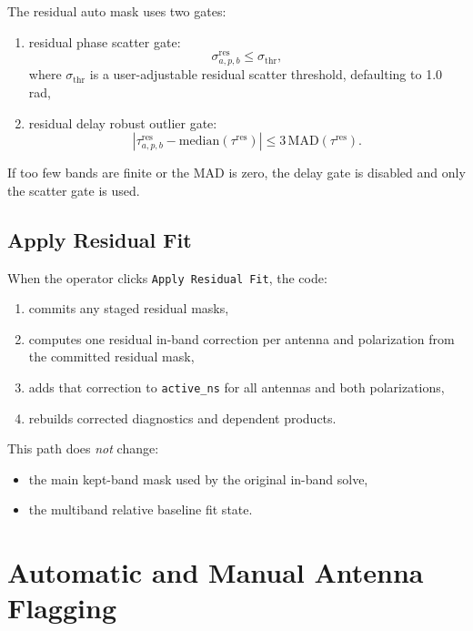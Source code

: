 \documentclass[11pt]{article}
\begin{document}
The residual auto mask uses two gates:
\begin{enumerate}[leftmargin=1.5em]
  \item residual phase scatter gate:
  \begin{equation}
    \sigma^{\mathrm{res}}_{a,p,b} \le \sigma_{\mathrm{thr}},
  \end{equation}
  where $\sigma_{\mathrm{thr}}$ is a user-adjustable residual scatter threshold,
  defaulting to 1.0 rad,
  \item residual delay robust outlier gate:
  \begin{equation}
    \left|\tau^{\mathrm{res}}_{a,p,b} - \mathrm{median}(\tau^{\mathrm{res}})\right|
    \le 3\,\mathrm{MAD}(\tau^{\mathrm{res}}).
  \end{equation}
\end{enumerate}

If too few bands are finite or the MAD is zero, the delay gate is disabled and
only the scatter gate is used.

\subsection{Apply Residual Fit}

When the operator clicks \texttt{Apply Residual Fit}, the code:
\begin{enumerate}[leftmargin=1.5em]
  \item commits any staged residual masks,
  \item computes one residual in-band correction per antenna and polarization
  from the committed residual mask,
  \item adds that correction to \texttt{active\_ns} for all antennas and both
  polarizations,
  \item rebuilds corrected diagnostics and dependent products.
\end{enumerate}

This path does \emph{not} change:
\begin{itemize}[leftmargin=1.5em]
  \item the main kept-band mask used by the original in-band solve,
  \item the multiband relative baseline fit state.
\end{itemize}

\section{Automatic and Manual Antenna Flagging}
\end{document}
